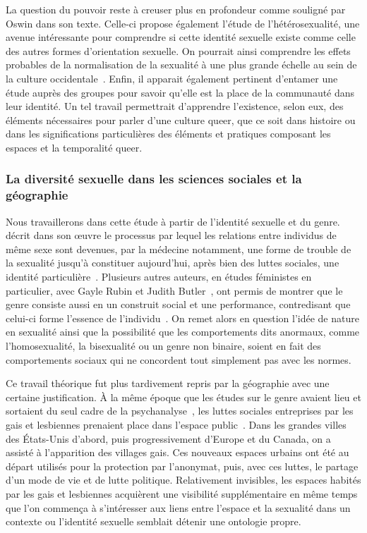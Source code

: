 La question du pouvoir reste à creuser plus en profondeur comme souligné par Oswin dans son texte. 
Celle-ci propose également l'étude de l'hétérosexualité, une avenue intéressante pour comprendre si cette identité sexuelle existe comme celle des autres formes d'orientation sexuelle. 
On pourrait ainsi comprendre les effets probables de la normalisation de la sexualité à une plus grande échelle au sein de la culture occidentale~\citep[100]{Oswin2008}. 
Enfin, il apparait également pertinent d’entamer une étude auprès des groupes \lgbt{} pour savoir qu'elle est la place de la communauté dans leur identité. 
Un tel travail permettrait d'apprendre l'existence, selon eux, des éléments nécessaires pour parler d'une culture queer, que ce soit dans histoire ou dans les significations particulières des éléments et pratiques composant les espaces et la temporalité queer.

\subsubsection{La diversité sexuelle dans les sciences sociales et la géographie}
\label{ssub:la_diversit_sexuelle_dans_les_sciences_sociales_et_la_g_ographie}
Nous travaillerons dans cette étude à partir de l'identité sexuelle et du genre.
\citet{Foucault2011} décrit dans son œuvre  le processus par lequel les relations entre individus de même sexe sont devenues, par la médecine notamment, une forme de trouble de la sexualité jusqu'à constituer aujourd'hui, après bien des luttes sociales, une identité particulière~\citep{Foucault2011}. 
Plusieurs autres auteurs, en études féministes en particulier, avec Gayle Rubin et Judith Butler~\citep[98]{Marcus2005}, ont permis de montrer que le genre consiste aussi en un construit social et une performance, contredisant que celui-ci forme l'essence de l'individu~\citep{Butler2007}. 
On remet alors en question l'idée de nature en sexualité ainsi que la possibilité que les comportements dits anormaux, comme l'homosexualité, la bisexualité ou un genre non binaire, soient en fait des comportements sociaux qui ne concordent tout simplement pas avec les normes.

Ce travail théorique fut plus tardivement repris par la géographie avec une certaine justification. 
À la même époque que les études sur le genre avaient lieu et sortaient du seul cadre de la psychanalyse~\citep{Rubin2011a,Rubin2011}, les luttes sociales entreprises par les gais et lesbiennes prenaient place dans l'espace public~\citep[422-427]{Spencer2005}. 
Dans les grandes villes des États-Unis d'abord, puis progressivement d'Europe et du Canada, on a assisté à l'apparition des villages gais. 
Ces nouveaux espaces urbains ont été au départ utilisés pour la protection par l'anonymat, puis, avec ces luttes, le partage d'un mode de vie et de lutte politique. 
Relativement invisibles, les espaces  habités par les gais et lesbiennes acquièrent une visibilité supplémentaire en même temps que l'on commença à s'intéresser aux liens entre l'espace et la sexualité dans un contexte ou l'identité sexuelle semblait détenir une ontologie propre.

